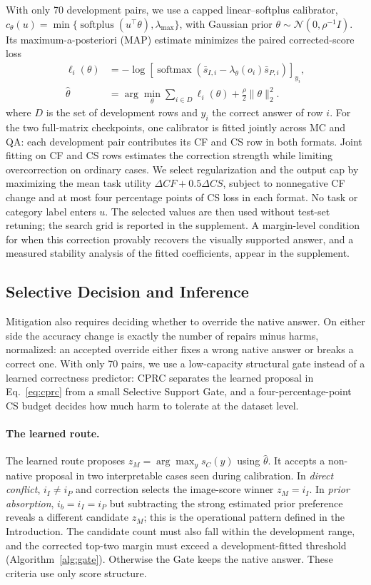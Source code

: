 \documentclass[letterpaper]{article}
\begin{document}
With only 70 development pairs, we use a capped linear--softplus calibrator,
$c_\theta(u)=\min\{\operatorname{softplus}(u^\top\theta),\lambda_{\max}\}$,
with Gaussian prior $\theta\sim\mathcal N(0,\rho^{-1}I)$. Its
maximum-a-posteriori (MAP) estimate minimizes the paired corrected-score loss
\begin{align}
\ell_i(\theta)&=-\log\!\left[
\operatorname{softmax}(\bar s_{I,i}-
\lambda_\theta(o_i)\bar s_{P,i})\right]_{y_i},\nonumber\\
\hat\theta&=\arg\min_\theta\sum_{i\in D}\ell_i(\theta)
+\frac{\rho}{2}\|\theta\|_2^2.
\label{eq:fit}
\end{align}
where $D$ is the set of development rows and $y_i$ the correct answer of row
$i$. For the two full-matrix checkpoints, one calibrator is fitted jointly across MC
and QA: each development pair contributes its CF and CS row in both formats.
Joint fitting on CF and CS rows estimates the correction strength while
limiting overcorrection on ordinary cases. We select regularization and the output
cap by maximizing the mean task utility $\Delta CF+0.5\Delta CS$, subject to
nonnegative CF change and at most four percentage points of CS loss in each
format. No task or category label enters $u$. The selected values are then used
without test-set retuning; the search grid is reported in the supplement.
A margin-level condition for when this correction provably recovers the
visually supported answer, and a measured stability analysis of the fitted
coefficients, appear in the supplement.

\subsection{Selective Decision and Inference}

Mitigation also requires deciding whether to override the native answer. On either side the
accuracy change is exactly the number of repairs minus harms, normalized: an
accepted override either fixes a wrong native answer or breaks a correct one.
With only 70 pairs, we use a low-capacity structural gate instead of a
learned correctness predictor: CPRC separates the learned
proposal in Eq.~\ref{eq:cprc} from a small Selective Support Gate, and a
four-percentage-point CS budget decides how much harm to tolerate at the
dataset level.

\paragraph{The learned route.}
The learned route proposes
$z_M=\arg\max_y s_C(y)$ using $\hat\theta$. It accepts a non-native proposal in
two interpretable cases seen during calibration. In \emph{direct conflict},
$i_I\ne i_P$ and correction selects the image-score winner $z_M=i_I$. In
\emph{prior absorption}, $i_b=i_I=i_P$ but subtracting the strong estimated
prior preference reveals a different candidate $z_M$; this is the operational pattern
defined in the Introduction. The candidate count must also fall within the
development range, and the corrected top-two margin must exceed a
development-fitted threshold (Algorithm~\ref{alg:gate}). Otherwise the Gate keeps the native answer. These criteria
use only score structure.
\end{document}
